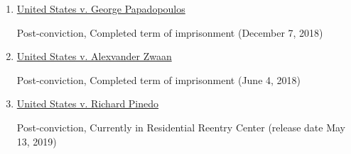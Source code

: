 \begin{enumerate}[1.]

    \item \underline{United States v. George Papadopoulos}

Post-conviction, Completed term of imprisonment (December 7, 2018)

    \item \underline{United States v. Alexvander Zwaan}

Post-conviction, Completed term of imprisonment (June 4, 2018)

    \item \underline{United States v. Richard Pinedo}

Post-conviction, Currently in Residential Reentry Center (release date May 13, 2019)

\end{enumerate}
